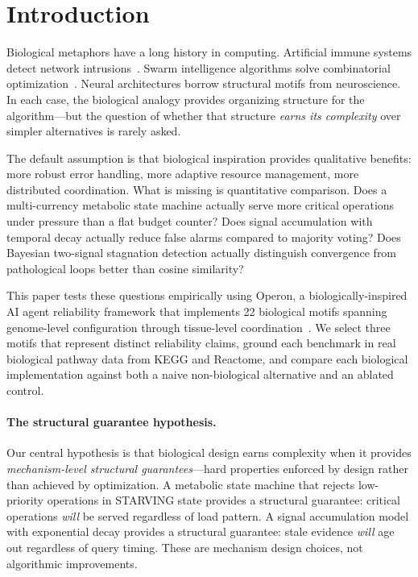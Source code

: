 \section{Introduction}\label{sec:intro}

Biological metaphors have a long history in computing.  Artificial
immune systems detect network intrusions~\cite{hofmeyr2000architecture}.
Swarm intelligence algorithms solve combinatorial
optimization~\cite{bonabeau1999swarm}.  Neural architectures borrow
structural motifs from neuroscience.  In each case, the biological
analogy provides organizing structure for the algorithm---but the
question of whether that structure \emph{earns its complexity} over
simpler alternatives is rarely asked.

The default assumption is that biological inspiration provides
qualitative benefits: more robust error handling, more adaptive
resource management, more distributed coordination.  What is missing
is quantitative comparison.  Does a multi-currency metabolic state
machine actually serve more critical operations under pressure than a
flat budget counter?  Does signal accumulation with temporal decay
actually reduce false alarms compared to majority voting?  Does
Bayesian two-signal stagnation detection actually distinguish
convergence from pathological loops better than cosine similarity?

This paper tests these questions empirically using Operon, a
biologically-inspired AI agent reliability framework that implements
22 biological motifs spanning genome-level configuration through
tissue-level coordination~\cite{banu2026operon}.  We select three
motifs that represent distinct reliability claims, ground each
benchmark in real biological pathway data from KEGG and Reactome,
and compare each biological implementation against both a naive
non-biological alternative and an ablated control.

\paragraph{The structural guarantee hypothesis.}
Our central hypothesis is that biological design earns complexity when
it provides \emph{mechanism-level structural guarantees}---hard
properties enforced by design rather than achieved by optimization.
A metabolic state machine that rejects low-priority operations in
STARVING state provides a structural guarantee: critical operations
\emph{will} be served regardless of load pattern.  A signal
accumulation model with exponential decay provides a structural
guarantee: stale evidence \emph{will} age out regardless of query
timing.  These are mechanism design choices, not algorithmic
improvements.

